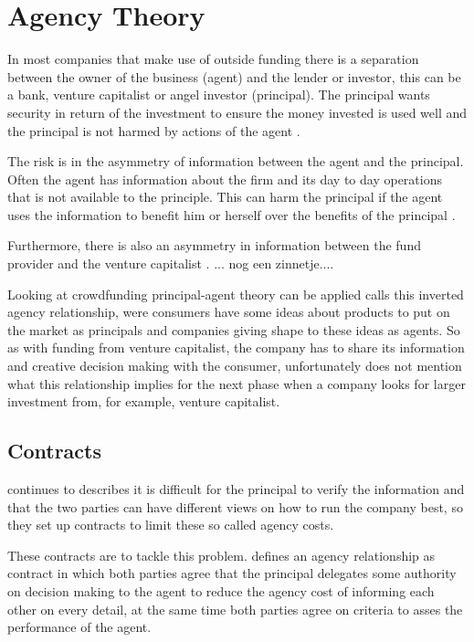 \documentclass[a4paper, 11pt]{article}
\begin{document}
\section{Agency Theory}

In most companies that make use of outside funding there is a separation between
the owner of the business (agent) and the lender or investor, this can be a
bank, venture capitalist or angel investor (principal). The principal wants
security in return of the investment to ensure the money invested is used well
and the principal is not harmed by actions of the agent \citep{jensen1976theory}.

The risk is in the asymmetry of information between the agent and the principal. Often the
agent has information about the firm and its day to day operations that is not
available to the principle. This can harm the principal if the agent uses the
information to benefit him or herself over the benefits of the principal
\citep{Osnabrugge2000}.

Furthermore, there is also an asymmetry in information between the fund provider and the venture capitalist \citep{casson2008oxford}. ... nog een zinnetje....

Looking at crowdfunding principal-agent theory can be applied \cite{chaney} calls this inverted agency relationship, were consumers have some ideas about products to put on the market as principals and companies giving shape to these ideas as agents. So as with funding from venture capitalist, the company has to share its information and creative decision making with the consumer, \citep{chaney} unfortunately does not mention what this relationship implies for the next phase when a company looks for larger investment from, for example, venture capitalist.



\subsection{Contracts}
\cite{Osnabrugge2000} continues to describes it is difficult for the principal to verify the information and that the two parties can have different views on how to run the company best, so they set up contracts to limit these so called agency costs.


These contracts are to tackle this problem. \cite{jensen1976theory} defines an agency relationship as contract in which both parties agree that the principal delegates some authority on decision making to the agent to reduce the agency cost of informing each other on every detail, at the same time both parties agree on criteria to asses the performance of the agent.
\end{document}
